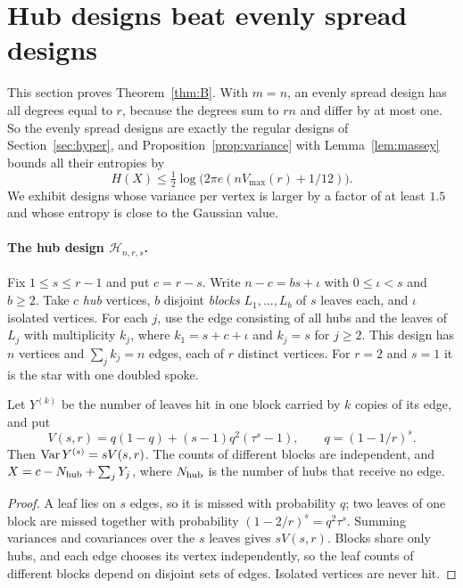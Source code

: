 \documentclass[11pt,a4paper]{article}
\theoremstyle{definition}\newtheorem{remark}[theorem]{Remark}\newtheorem{conjecture}{Conjecture}
\begin{document}
\section{Hub designs beat evenly spread designs}\label{sec:hubs}
This section proves Theorem~\ref{thm:B}. With $m=n$, an evenly spread design has all degrees equal to $r$, because the degrees sum to $rn$ and differ by at most one. So the evenly spread designs are exactly the regular designs of Section~\ref{sec:hyper}, and Proposition~\ref{prop:variance} with Lemma~\ref{lem:massey} bounds all their entropies by
\begin{equation}\label{eq:balancedupper}
H(X)\le\tfrac12\log\big(2\pi e(nV_{\max}(r)+1/12)\big).
\end{equation}
We exhibit designs whose variance per vertex is larger by a factor of at least $1.5$ and whose entropy is close to the Gaussian value.

\paragraph{The hub design $\mathcal H_{n,r,s}$.} Fix $1\le s\le r-1$ and put $c=r-s$. Write $n-c=bs+\iota$ with $0\le\iota<s$ and $b\ge2$. Take $c$ \emph{hub} vertices, $b$ disjoint \emph{blocks} $L_1,\ldots,L_b$ of $s$ leaves each, and $\iota$ isolated vertices. For each $j$, use the edge consisting of all hubs and the leaves of $L_j$ with multiplicity $k_j$, where $k_1=s+c+\iota$ and $k_j=s$ for $j\ge2$. This design has $n$ vertices and $\sum_jk_j=n$ edges, each of $r$ distinct vertices. For $r=2$ and $s=1$ it is the star with one doubled spoke.

\begin{proposition}\label{prop:hubvar}
Let $Y^{(k)}$ be the number of leaves hit in one block carried by $k$ copies of its edge, and put
\[
V(s,r)=q(1-q)+(s-1)q^2(\tau^s-1),\qquad q=(1-1/r)^s .
\]
Then $\operatorname{Var} Y^{(s)}=sV(s,r)$. The counts of different blocks are independent, and $X=c-N_{\rm hub}+\sum_jY_j$, where $N_{\rm hub}$ is the number of hubs that receive no edge.
\end{proposition}
\begin{proof}
A leaf lies on $s$ edges, so it is missed with probability $q$; two leaves of one block are missed together with probability $(1-2/r)^s=q^2\tau^s$. Summing variances and covariances over the $s$ leaves gives $sV(s,r)$. Blocks share only hubs, and each edge chooses its vertex independently, so the leaf counts of different blocks depend on disjoint sets of edges. Isolated vertices are never hit.
\end{proof}
\end{document}
